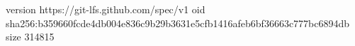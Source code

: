 version https://git-lfs.github.com/spec/v1
oid sha256:b359660fcde4db004e836c9b29b3631e5cfb1416afeb6bf36663c777bc6894db
size 314815
